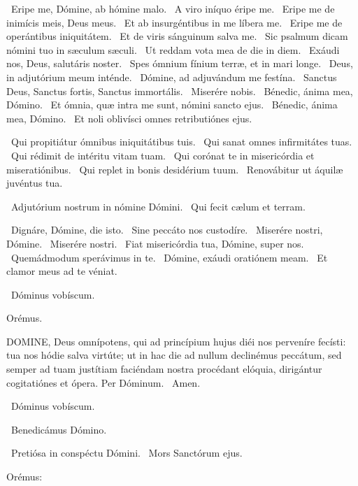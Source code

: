 
\V\ Eripe me, Dómine, ab hómine malo. \R\ A viro iníquo éripe me. \V\ Eripe me de inimícis meis, Deus meus. \R\ Et ab insurgéntibus in me líbera me. \V\ Eripe me de operántibus iniquitátem. \R\ Et de viris sánguinum salva me. \V\ Sic psalmum dicam nómini tuo in sæculum sæculi. \R\ Ut reddam vota mea de die in diem. \V\ Exáudi nos, Deus, salutáris noster. \R\ Spes ómnium fínium terræ, et in mari longe. \V\ Deus, in adjutórium meum inténde. \R\ Dómine, ad adjuvándum me festína. \V\ Sanctus Deus, Sanctus fortis, Sanctus immortális. \R\ Miserére nobis. \V\ Bénedic, ánima mea, Dómino. \R\ Et ómnia, quæ intra me sunt, nómini sancto ejus. \V\ Bénedic, ánima mea, Dómino. \R\ Et noli oblivísci omnes retributiónes ejus.

\V\ Qui propitiátur ómnibus iniquitátibus tuis. \R\ Qui sanat omnes infirmitátes tuas. \V\ Qui rédimit de intéritu vitam tuam. \R\ Qui corónat te in misericórdia et miseratiónibus. \V\ Qui replet in bonis desidérium tuum. \R\ Renovábitur ut áquilæ juvéntus tua.


\V\ Adjutórium nostrum in nómine Dómini. \R\ Qui fecit cælum et terram.


\V\ Dignáre, Dómine, die isto. \R\ Sine peccáto nos custodíre. \V\ Miserére nostri, Dómine. \R\ Miserére nostri. \V\ Fiat misericórdia tua, Dómine, super nos. \R\ Quemádmodum sperávimus in te. \V\ Dómine, exáudi oratiónem meam. \R\ Et clamor meus ad te véniat.

\V\ Dóminus vobíscum.

Orémus. 

\lettrine[lines=2]{D}{OMINE}, Deus omnípotens, qui ad princípium hujus diéi nos perveníre fecísti: tua nos hódie salva virtúte; ut in hac die ad nullum declinémus peccátum, sed semper ad tuam justítiam faciéndam nostra procédant elóquia, dirigántur cogitatiónes et ópera. Per Dóminum. \R\ Amen.

\V\ Dóminus vobíscum.

\V\ Benedicámus Dómino.


\V\ Pretiósa in conspéctu Dómini. \R\ Mors Sanctórum ejus.

 Orémus:

